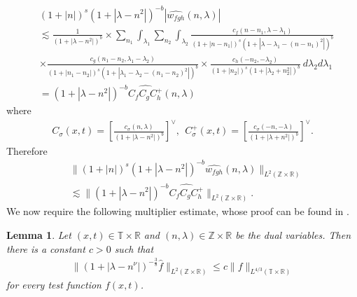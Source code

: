 \documentclass[12pt,reqno]{amsart}
\numberwithin{equation}{section}  %
\newcommand{\rr}{\mathbb{R}}
\newcommand{\zz}{\mathbb{Z}}
\newcommand{\ci}{\mathbb{T}}
\newcommand{\wh}{\widehat}
\newtheorem{lemma}[theorem]{Lemma}
\begin{document}
\begin{equation*}
	\begin{split}
		& \left (1 + |n| \right )^s \left( 1 +  | \lambda - n^{2}  | \right)^{-b} | 
		\wh{w_{fgh}}\left( n, \lambda \right) | 
		\\
    & \lesssim  \frac{1}{\left( 1 +
		| \lambda - n^{2}| 
		\right)^{b}}  
		\times
    \sum_{n_{1} } \int_{\lambda_{1}} \sum_{n_{2}}
    \int_{\lambda_{2}} \frac{c_f\left( n - n_{1}, \lambda - \lambda_1 
		\right)}{\left (1 + |n - n_{1}| \right )^s \left( 1 + | \lambda - \lambda_1 - (n - n_{1})^{2} |
		\right)^{b}}
		\\
		& \times \frac{c_{g}\left( n_1 - n_2, \lambda_1 - \lambda_2 \right)}{\left (1 + |n_1 - n_2| \right ) 
		^s\left( 1 + | \lambda_1 - \lambda_2 -  (n_1 - n_2)^{2}| 
		\right)^{b}}
    \times \frac{c_{h}\left( -n_2, -\lambda_2 \right)}{\left (1 + |n_2| \right )
    ^s \left( 1 + | \lambda_2 + n_2^{2} | \right)^{b}} \ d \lambda_2 d \lambda_1 
    \\
		& = \left( 1 + | \lambda - n^{2} | \right)^{-b}
		\wh{C_f C_{g} C^+_{h}} \left( n, \lambda \right)
	\end{split}
\end{equation*}
%
%
where
%
%
\begin{equation*}
	\begin{split}
		C_\sigma(x, t) = \left[ \frac{c_\sigma\left( n, \lambda \right)}{\left( 
		1 + | \lambda - n^{2} | \right)^{b}} \right]^\vee,
		\ \ C^+_\sigma(x, t) = \left[ \frac{c_\sigma\left( -n, -\lambda \right)}{\left( 
		1 + | \lambda + n^{2} | \right)^{b}} \right]^\vee.
	\end{split}
\end{equation*}
%
%
Therefore
%
%
\begin{equation}
	\label{ngen-holder-pre-estimate}
	\begin{split}
		& \| \left( 1 + |n | \right)^s
		\left( 1 + | \lambda - n^{2} | \right)^{-b} \wh{w_{fgh}}(n, 
		\lambda)		
		\|_{L^2(\zz \times \rr)}
		\\
		& \lesssim \| \left( 1 + | \lambda - n^{2} | \right)^{-b}
		\wh{C_f C_{g} C^+_{h}} \|_{L^2(\zz \times \rr)}.
	\end{split}
\end{equation}
%
We now require the following multiplier estimate, whose proof can be found in
\cite{Bourgain-Fourier-transfo-1}. 
%
%
%
%
%
%
%
%
%
%
%
%
%
%
\begin{lemma}
	\label{nlem:four-mult-est-L4}
	Let $(x, t) \in \ci \times \rr $ and $(n, \lambda) \in \zz \times \rr$ be 
	the dual variables. Then there is a 
	constant $c > 0$ such that
%
%
\begin{equation}
	\label{nfour-mult-est-L4*}
	\begin{split}
		\| \left( 1 + | \lambda - n^\nu | 
		\right)^{-\frac{3}{8}}
		\wh{f}\|_{L^2(\zz \times \rr)} \le c \|f \|_{L^{4/3}( \ci \times \rr)}
	\end{split}
\end{equation}
for every test function $f(x, t)$. 
%
%
\end{lemma}
\end{document}
